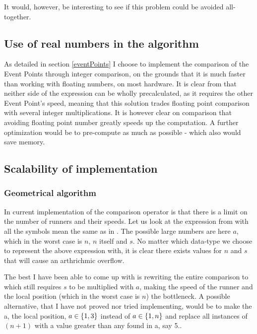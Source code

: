 It would, however, be interesting to see if this problem could be avoided all-together.

\subsection{Use of real numbers in the algorithm}
As detailed in section \ref{eventPoints} I choose to implement the comparison of the Event Points through integer comparison, on the grounds that it is much faster than working with floating numbers, on most hardware. It is clear from  that neither side of the expression can be wholly precalculated, as it requires the other Event Point's speed, meaning that this solution trades floating point comparison with several integer multiplications. It is however clear on comparison that avoiding floating point number greatly speeds up the computation. A further optimization would be to pre-compute as much as possible - which also would save memory.

\subsection{Scalability of implementation}
\label{scale}

\subsubsection{Geometrical algorithm}
In current implementation of the comparison operator is that there is a limit on the number of runners and their speeds. Let us look at the expression 
 from  with all the symbols mean the same as in . The possible large numbers are here $a$, which in the worst case is $n$, $n$ itself and $s$. No matter which data-type we choose to represent the above expression with, it is clear there exists values for $n$ and $s$ that will cause an arthrichmic overflow.

The best I have been able to come up with is rewriting the entire comparison to 
which still requires $s$ to be multiplied with $a$, making the speed of the runner and the local position (which in the worst case is $n$) the bottleneck. A possible alternative, that I have not proved nor tried implementing, would be to make the a, the local position, $a \in \{1, 3\}$ instead of $a \in \{1, n\}$ and replace all instances of $(n+1)$ with a value greater than any found in a, say 5..

